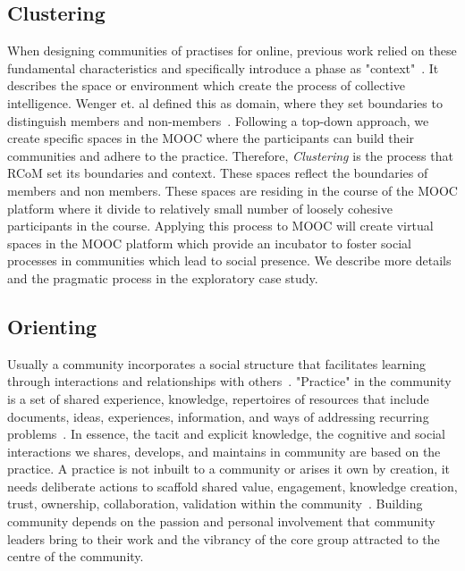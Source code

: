 \documentclass[format=acmsmall, review=false, screen=true]{acmart}
\begin{document}
\subsection{Clustering} 
When designing communities of practises for online, previous work relied on these fundamental characteristics and specifically introduce a phase as "context"~\cite{gunawardena2009theoretical}. It describes the space or environment which create the process of collective intelligence. Wenger et. al defined this as domain, where they set boundaries to distinguish members and non-members~\cite{wenger2010communities}. Following a top-down approach, we create specific spaces in the MOOC where the participants can build their communities and adhere to the practice. Therefore, \textit{Clustering} is the process that RCoM set its boundaries and context. These spaces reflect the boundaries of members and non members. These spaces are residing in the course of the MOOC platform where it divide to relatively small number of loosely cohesive participants in the course. Applying this process to MOOC will create virtual spaces in the MOOC platform which provide an incubator to foster social processes in communities which lead to social presence. We describe more details and the pragmatic process in the exploratory case study. 

\subsection{Orienting} 
Usually a community incorporates a social structure that facilitates learning through interactions and relationships with others~\cite{wenger2001harvard}. "Practice" in the community is a set of shared experience, knowledge, repertoires of resources that include documents, ideas, experiences, information, and ways of addressing recurring problems~\cite{wenger2001harvard}. In essence, the tacit and explicit knowledge, the cognitive and social interactions we shares, develops, and maintains in community are based on the practice. A practice is not inbuilt to a community or arises it own by creation, it needs deliberate actions to scaffold shared value, engagement, knowledge creation, trust, ownership, collaboration, validation within the community~\cite{liu2009community}. Building community depends on the passion and personal involvement that community leaders bring to their work and the vibrancy of the core group attracted to the centre of the community. 
\end{document}
